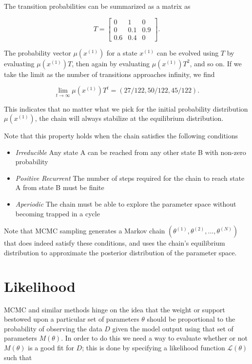 \documentclass[12pt]{article}
\begin{document}
    The transition probabilities can be summarized as a matrix as

    $$
    T = 
    \begin{bmatrix}
        0 & 1 & 0 \\
        0 & 0.1 & 0.9 \\
        0.6 & 0.4 & 0
    \end{bmatrix}.
    $$

    The probability vector $\mu(x^{(1)})$ for a state $x^{(1)}$ can be evolved using $T$ by evaluating $\mu(x^{(1)})T$, then again by evaluating $\mu(x^{(1)})T^2$, and so on. If we take the limit as the number of transitions approaches infinity, we find

    $$
        \lim_{t \to \infty} \mu(x^{(1)})T^t = (27/122, 50/122, 45/122).
    $$

    This indicates that no matter what we pick for the initial probability distribution $\mu(x^{(1)})$, the chain will always stabilize at the equilibrium distribution.

    Note that this property holds when the chain satisfies the following conditions

    \begin{itemize}
        \item \textit{Irreducible} Any state A can be reached from any other state B with non-zero probability
        \item \textit{Positive Recurrent} The number of steps required for the chain to reach state A from state B must be finite
        \item \textit{Aperiodic} The chain must be able to explore the parameter space without becoming trapped in a cycle
    \end{itemize}

    Note that MCMC sampling generates a Markov chain $(\theta^{(1)}, \theta^{(2)},..., \theta^{(N)})$ that does indeed satisfy these conditions, and uses the chain's equilibrium distribution to approximate the posterior distribution of the parameter space.    


\section{Likelihood}

    MCMC and similar methods hinge on the idea that the weight or support bestowed upon a particular set of parameters $\theta$ should be proportional to the probability of observing the data $D$ given the model output using that set of parameters $M(\theta)$. In order to do this we need a way to evaluate whether or not $M(\theta)$ is a good fit for $D$; this is done by specifying a likelihood function $\mathcal{L}(\theta)$ such that
\end{document}
